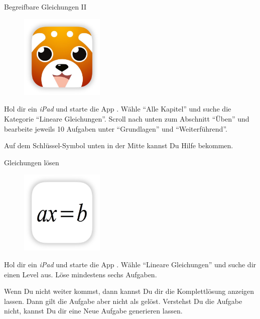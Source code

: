 \documentclass[12pt,a5paper,landscape]{scrartcl}
\begin{document}
\begin{karte2}[\symHandy]{Begreifbare Gleichungen II}
\vspace*{2cm}
\begin{wrapfig}
	\begin{figure}
	\includegraphics[width=4cm]{7.4-LT-Abb_Maphi}
	\end{figure}
	Hol dir ein \emph{iPad} und starte die App . Wähle \enquote{Alle Kapitel} und suche die Kategorie \enquote{Lineare Gleichungen}. Scroll nach unten zum Abschnitt \enquote{Üben} und bearbeite jeweils 10 Aufgaben unter \enquote{Grundlagen} und \enquote{Weiterführend}. 
	
	Auf dem Schlüssel-Symbol unten in der Mitte kannst Du Hilfe bekommen.
\end{wrapfig}
\end{karte2}

\leereKarte

\begin{karte2}[\symHandy]{Gleichungen lösen}
\vspace*{2cm}
\begin{wrapfig}
	\begin{figure}
	\includegraphics[width=4cm]{7.4-LT-Abb_Lineare Gleichungen}
	\end{figure}
	Hol dir ein \emph{iPad} und starte die App . Wähle \enquote{Lineare Gleichungen} und suche dir einen Level aus. Löse mindestens sechs Aufgaben. 
	
	Wenn Du nicht weiter kommst, dann kannst Du dir die Komplettlösung anzeigen lassen. Dann gilt die Aufgabe aber nicht als gelöst. Verstehst Du die Aufgabe nicht, kannst Du dir eine Neue Aufgabe generieren lassen.
\end{wrapfig}
\end{karte2}
\end{document}
